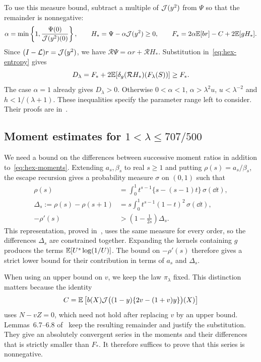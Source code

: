 To use this measure bound, subtract a multiple of $\mathcal J(y^2)$ from $\Psi$ so that the remainder is nonnegative:
\[
 \alpha=\min\left\{1,\frac{\Psi(0)}{\mathcal J(y^2)(0)}\right\},\qquad
 H_* =\Psi-\alpha\mathcal J(y^2)\ge0,\qquad
 F_*=2\alpha\mathbb E[br]-C+2\mathbb E[gH_*].
\]
Since $(I-\mathcal L)r=\mathcal J(y^2)$, we have $\mathcal R\Psi=\alpha r+\mathcal RH_*$. Substitution in~\eqref{eq:hex-entropy} gives
\begin{equation}\label{eq:hex-calibration}
 D_\lambda=F_*+2\mathbb E[\delta_g(\mathcal RH_*)(F_\lambda(S))]\ge F_*.
\end{equation}
The case $\alpha=1$ already gives $D_\lambda>0$. Otherwise
$0<\alpha<1$, $\alpha>\lambda^2u$, $u<\lambda^{-2}$ and
$h<1/(\lambda+1)$. These inequalities specify the parameter range left to consider. Their proofs are in~\cite[Lemmas~6.4--6.5]{FullVersion}.

\newpage
\subsection{Moment estimates for \texorpdfstring{$1<\lambda\le707/500$}{1 < lambda <= 707/500}}
We need a bound on the differences between successive moment ratios in addition to~\eqref{eq:hex-moments}. Extending $a_s,\beta_s$ to real
$s\ge1$ and putting $\rho(s)=a_s/\beta_s$, the escape recursion gives a probability measure $\sigma$ on $(0,1)$ such that
\begin{align*}
 \rho(s)&=\int_0^1 t^{s-1}\{s-(s-1)t\}\,\sigma(\dd t),\\
 \Delta_s:=\rho(s)-\rho(s+1)
 &=s\int_0^1t^{s-1}(1-t)^2\,\sigma(\dd t),\\
 -\rho'(s)&>\left(1-\frac1{2s}\right)\Delta_s.
\end{align*}
This representation, proved in~\cite[Lemma~6.6]{FullVersion}, uses the same measure for every order, so the differences $\Delta_s$ are constrained together. Expanding the kernels containing $g$ produces the terms $\mathbb E[U^s\log(1/U)]$. The bound on $-\rho'(s)$ therefore gives a strict lower bound for their contribution in terms of $a_s$ and $\Delta_s$.

When using an upper bound on $v$, we keep the law $\pi_\lambda$ fixed. This distinction matters because the identity
\[
 C=\mathbb E\left[b(X)\mathcal J\bigl((1-y)\{2v-(1+v)y\}\bigr)(X)\right]
\]
uses $N-vZ=0$, which need not hold after replacing $v$ by an upper bound. Lemmas~6.7--6.8 of~\cite{FullVersion} keep the resulting remainder and justify the substitution. They give an absolutely convergent series in the moments and their differences that is strictly smaller than $F_*$. It therefore suffices to prove that this series is nonnegative.

